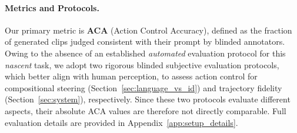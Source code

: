 \paragraph{Metrics and Protocols.}
Our primary metric is \textbf{ACA} (Action Control Accuracy), defined as the
fraction of generated clips judged consistent with their prompt by blinded annotators.
Owing to the absence of an established \textit{automated} evaluation 
protocol for this \textit{nascent} task, 
we adopt two rigorous blinded subjective evaluation protocols,
which better align with human perception,
to assess 
action control 
for compositional steering (Section~\ref{sec:language_vs_id}) and trajectory fidelity (Section~\ref{sec:system}), respectively.
Since these two protocols evaluate different aspects, their absolute
 ACA values are therefore not directly comparable.
Full evaluation details are provided in Appendix~\ref{app:setup_details}.
